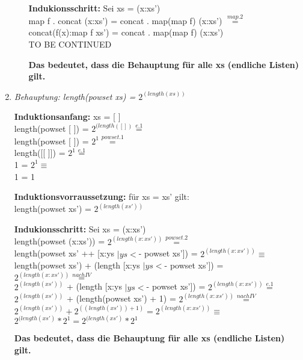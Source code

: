 \documentclass[11pt]{article}
\begin{document}
\begin{enumerate}
\begin{enumerate}
\vspace*{0.5cm}
\textbf{Indukionsschritt:} Sei xs = (x:xs')\\
map f . concat (x:xs') = concat . map(map f) (x:xs') $\stackrel{map.2}{=}$\\
concat(f(x):map f xs') = concat . map(map f) (x:xs')\\
TO BE CONTINUED

\vspace*{0.5cm}
\textbf{Das bedeutet, dass die Behauptung für alle xs (endliche Listen) gilt.}
\end{enumerate}
\item
\vspace*{0.5cm}
\textit{Behauptung: length(powset xs) = $2^{(length(xs))}$}

\vspace*{0.5cm}
\textbf{Induktionsanfang:} xs = [ ]\\
length(powset [ ]) = $2^{(length([ ])} \stackrel{e.1}{=}$\\
length(powset [ ]) = $2^1 \stackrel{powset.1}{=}$\\
length([[ ]]) = $2^1 \stackrel{e.1}{=}$\\
1 = $2^1 \equiv$\\
1 = 1

\vspace*{0.5cm}
\textbf{Induktionsvorraussetzung:} für xs = xs' gilt:\\
length(powset xs') = $2^{(length(xs'))}$

\vspace*{0.5cm}
\textbf{Indukionsschritt:} Sei xs = (x:xs')\\
length(powset (x:xs')) = $2^{(length(x:xs'))} \stackrel{powset.2}{=}$\\
length(powset xs' ++ [x:ys $\mid ys <$- powset xs']) = $2^{(length(x:xs'))} \equiv$\\
length(powset xs') + (length [x:ys $\mid ys <$- powset xs']) = $2^{(length(x:xs'))} \stackrel{nach IV}{=}$\\
$2^{(length(xs'))}$ + (length [x:ys $\mid ys  <$- powset xs']) = $2^{(length(x:xs'))} \stackrel{e.1}{=}$\\
$2^{(length(xs'))}$ + (length(powset xs') + 1) = $2^{(length(x:xs'))} \stackrel {nach IV}{=}$\\
$2^{(length(xs'))} + 2^{((length(xs')) + 1)} = 2^{(length(x:xs'))} \equiv$\\
$2^{(length(xs')} * 2^1 = 2^{(length(xs')} * 2^1$

\vspace*{0.5cm}
\textbf{Das bedeutet, dass die Behauptung für alle xs (endliche Listen) gilt.}


\end{enumerate}
\end{document}
